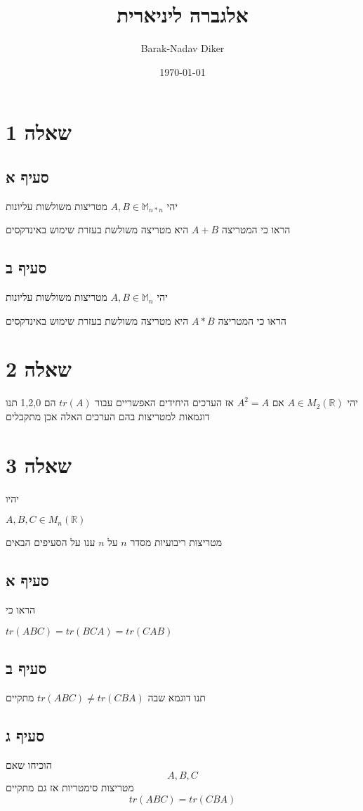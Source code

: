 \documentclass[11pt]{article}
\author{Barak-Nadav Diker}
\date{\today}
\title{אלגברה ליניארית}
\begin{document}
\maketitle
\newpage
\section*{שאלה 1}
\label{sec:org9393a63}
\subsection*{סעיף א}
\label{sec:orgb6a40ad}
יהי
\(A,B \in \mathbb{M} _{n*n}\)
מטריצות משולשות עליונות

הראו כי המטריצה
\(A+B\)
היא מטריצה משולשת
בעזרת שימוש באינדקסים
\subsection*{סעיף ב}
\label{sec:org7fe3ca9}
יהי
\(A,B \in \mathbb{M} _{n}\)
מטריצות משולשות עליונות

הראו כי המטריצה
\(A*B\)
היא מטריצה משולשת
בעזרת שימוש באינדקסים
\section*{שאלה 2}
\label{sec:org077ed1d}
יהי
\(A\in M_{2} (\mathbb{R})\)
אם
\(A^2 = A\)
אז הערכים היחידים האפשריים עבור
\(tr(A)\)
הם
1,2,0
תנו דוגמאות למטריצות בהם הערכים האלה אכן מתקבלים
\section*{שאלה 3}
\label{sec:org67cb190}
יהיו

\(A,B,C \in M_n(\mathbb{R})\)

מטריצות ריבועיות מסדר
\(n\)
על
\(n\)
ענו על הסעיפים הבאים
\subsection*{סעיף א}
\label{sec:orgf77c292}
הראו כי

\(tr(ABC) = tr(BCA) = tr(CAB)\)
\subsection*{סעיף ב}
\label{sec:orge6a2c80}
תנו דוגמא שבה
\(tr(ABC) \neq tr(CBA)\)
מתקיים
\subsection*{סעיף ג}
\label{sec:org73e12a3}
הוכיחו שאם
\[A,B,C\]
מטריצות סימטריות אז גם
מתקיים
\[ tr(ABC) = tr(CBA) \]
\end{document}
